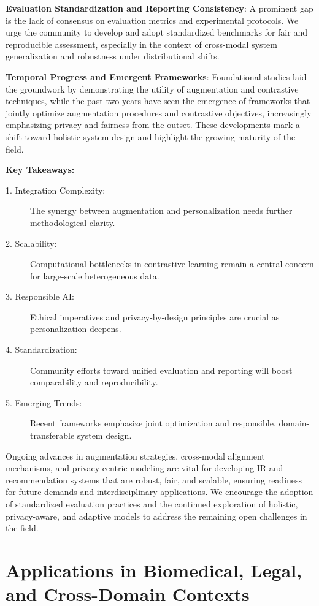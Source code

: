 \documentclass[sigconf]{acmart}
\begin{document}
\textbf{Evaluation Standardization and Reporting Consistency}: A prominent gap is the lack of consensus on evaluation metrics and experimental protocols. We urge the community to develop and adopt standardized benchmarks for fair and reproducible assessment, especially in the context of cross-modal system generalization and robustness under distributional shifts.

\textbf{Temporal Progress and Emergent Frameworks}: Foundational studies laid the groundwork by demonstrating the utility of augmentation and contrastive techniques, while the past two years have seen the emergence of frameworks that jointly optimize augmentation procedures and contrastive objectives, increasingly emphasizing privacy and fairness from the outset. These developments mark a shift toward holistic system design and highlight the growing maturity of the field.

\vspace{0.3em}
\noindent\textbf{Key Takeaways:}
\vspace{-0.5em}
\begin{description}
\item[1. Integration Complexity:] The synergy between augmentation and personalization needs further methodological clarity.
\item[2. Scalability:] Computational bottlenecks in contrastive learning remain a central concern for large-scale heterogeneous data.
\item[3. Responsible AI:] Ethical imperatives and privacy-by-design principles are crucial as personalization deepens.
\item[4. Standardization:] Community efforts toward unified evaluation and reporting will boost comparability and reproducibility.
\item[5. Emerging Trends:] Recent frameworks emphasize joint optimization and responsible, domain-transferable system design.
\end{description}

Ongoing advances in augmentation strategies, cross-modal alignment mechanisms, and privacy-centric modeling are vital for developing IR and recommendation systems that are robust, fair, and scalable, ensuring readiness for future demands and interdisciplinary applications. We encourage the adoption of standardized evaluation practices and the continued exploration of holistic, privacy-aware, and adaptive models to address the remaining open challenges in the field.

\section{Applications in Biomedical, Legal, and Cross-Domain Contexts}
\end{document}
